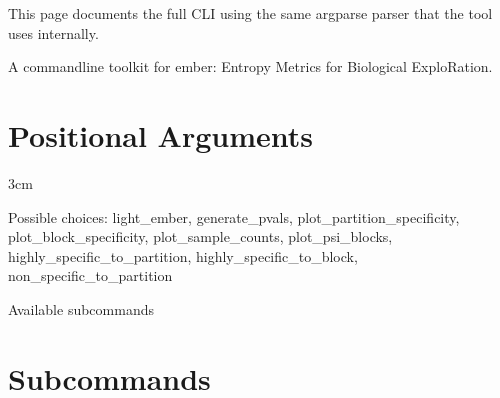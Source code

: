 \documentclass[letterpaper,10pt,english]{sphinxmanual}
\begin{document}
\sphinxAtStartPar
This page documents the full CLI using the same argparse parser that the
tool uses internally.

\sphinxAtStartPar

\sphinxAtStartPar
A command\sphinxhyphen{}line toolkit for ember: Entropy Metrics for Biological ExploRation.


\begin{sphinxVerbatim}[commandchars=\\\{\}]
  \PYG{p}{[}\PYG{p}{]}
\end{sphinxVerbatim}


\section{Positional Arguments}
\label{\detokenize{cli:ember_py.cli-create_parser-positional-arguments}}\begin{optionlist}{3cm}
\item [command]  
\sphinxAtStartPar
Possible choices: light\_ember, generate\_pvals, plot\_partition\_specificity, plot\_block\_specificity, plot\_sample\_counts, plot\_psi\_blocks, highly\_specific\_to\_partition, highly\_specific\_to\_block, non\_specific\_to\_partition

\sphinxAtStartPar
Available sub\sphinxhyphen{}commands
\end{optionlist}


\section{Sub\sphinxhyphen{}commands}
\label{\detokenize{cli:Sub-commands}}
\end{document}

